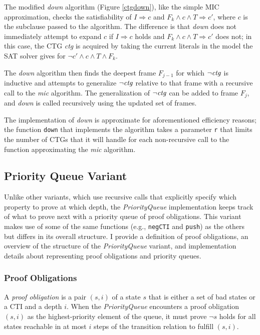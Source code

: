 \documentclass[12pt,a4paper,twoside,openright]{report}
\begin{document}
{{The modified {\it down} algorithm (Figure \ref{ctgdown}), like the simple MIC approximation,
checks the satisfiability of
$I \Rightarrow c$ and $F_k \wedge c \wedge T \Rightarrow c'$, where $c$ is the subclause passed to
the algorithm.
The difference is that {\it down} does not immediately attempt to expand $c$
if $I \Rightarrow c$ holds and $F_k \wedge c \wedge T \Rightarrow c'$ does
not; in this case, the CTG {\it ctg} is acquired by taking the current literals in
the model the SAT solver gives for $\neg c' \wedge c \wedge T \wedge F_k$.

The {\it down} algorithm then finds the deepest frame $F_{j - 1}$ for which $\neg {\it ctg}$ is inductive
and attempts to generalize $\neg {\it ctg}$ relative to that frame with a recursive call to the
{\it mic} algorithm. The generalization of $\neg {\it ctg}$ can be added to frame $F_j$,
and {\it down} is called recursively using the updated set of frames.

The implementation of {\it down} is approximate for aforementioned efficiency
reasons; the function \verb,down, that implements
the algorithm takes a parameter \verb,r, that limits the number of CTGs that it will handle for
each non-recursive call to the function approximating the {\it mic} algorithm.

\subsection{Priority Queue Variant}
\label{pqueue}
Unlike other variants, which use recursive calls that explicitly specify which property
to prove at which depth, the \emph{PriorityQueue} implementation keeps track of what
to prove next with a priority queue of proof obligations.
This variant makes
use of some of the same functions (e.g., \verb,negCTI, and \verb,push,) as the others but
differs in its overall structure.
I provide a definition of proof obligations, an
overview of the structure of the \emph{PriorityQueue} variant,
and implementation details about representing proof obligations and priority queues.

\subsubsection{Proof Obligations}
A \emph{proof obligation} is a pair $(s,i)$ of a state $s$ that is either a set of bad states
or a CTI and a depth $i$. When the \emph{PriorityQueue} encounters a proof obligation
$(s,i)$ as the highest-priority element of the queue, it must prove $\neg s$ holds for all states
reachable in at most $i$ steps of the transition relation to fulfill
$(s, i)$.

}}
\end{document}
